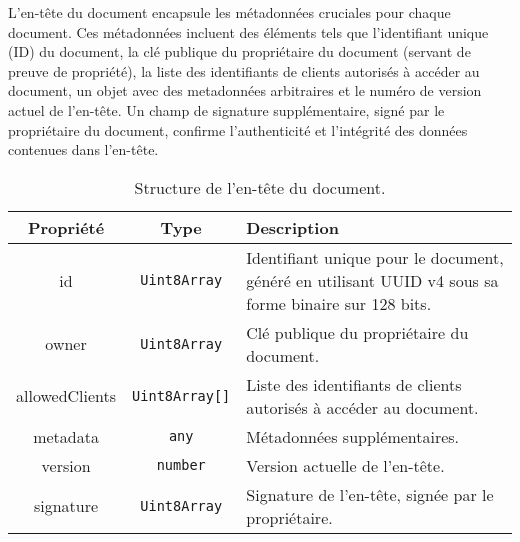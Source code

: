 L'en-tête du document encapsule les métadonnées cruciales pour chaque document.
Ces métadonnées incluent des éléments tels que l'identifiant unique (ID) du document, la clé publique du propriétaire du document (servant de preuve de propriété), la liste des identifiants de clients autorisés à accéder au document, un objet avec des metadonnées arbitraires et le numéro de version actuel de l'en-tête. Un champ de signature supplémentaire, signé par le propriétaire du document, confirme l'authenticité et l'intégrité des données contenues dans l'en-tête.

\setlength{\extrarowheight}{2pt}

\begin{table}[h]
  \begin{center}
    \caption{Structure de l'en-tête du document.}
    \begin{tabularx}{\textwidth}{|c|c|X|}
      \hline
      \rowcolor{gray!20}
      \textbf{Propriété} & \textbf{Type}         & \textbf{Description}                                                                                 \\
      \hline
      id                 & \texttt{Uint8Array}   & Identifiant unique pour le document, généré en utilisant UUID v4 sous sa forme binaire sur 128 bits. \\
      \hline
      owner              & \texttt{Uint8Array}   & Clé publique du propriétaire du document.                                                            \\
      \hline
      allowedClients     & \texttt{Uint8Array[]} & Liste des identifiants de clients autorisés à accéder au document.                                   \\
      \hline
      metadata           & \texttt{any}          & Métadonnées supplémentaires.                                                                         \\
      \hline
      version            & \texttt{number}       & Version actuelle de l'en-tête.                                                                       \\
      \hline
      signature          & \texttt{Uint8Array}   & Signature de l'en-tête, signée par le propriétaire.                                                  \\
      \hline
    \end{tabularx}
  \end{center}
\end{table}



